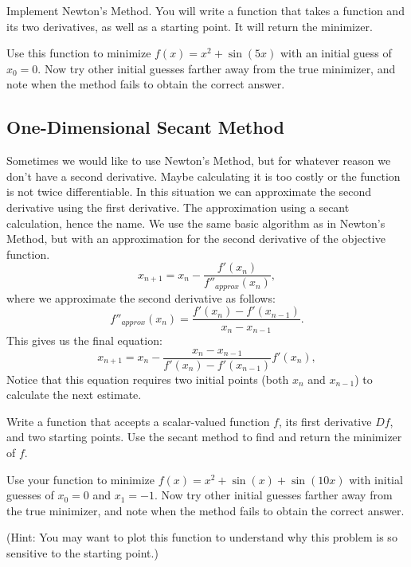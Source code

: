 \begin{problem}
Implement Newton's Method.
You will write a function that takes a function and its two derivatives, as well as a starting point.
It will return the minimizer.

Use this function to minimize $f(x) = x^2 + \sin(5x)$ with an initial guess of $x_0 = 0$.
Now try other initial guesses farther away from the true minimizer, and note when the method fails to obtain the correct answer.
\end{problem}

\subsection*{One-Dimensional Secant Method} %

Sometimes we would like to use Newton's Method, but for whatever reason we don't have a second derivative.
Maybe calculating it is too costly or the function is not twice differentiable.
In this situation we can approximate the second derivative using the first derivative.
The approximation using a secant calculation, hence the name.
We use the same basic algorithm as in Newton's Method, but with an approximation for the second derivative of the objective function.
\begin{equation*}
x_{n+1} = x_n - \frac{f'(x_n)}{f''_{approx}(x_n)},
\end{equation*}
where we approximate the second derivative as follows:
\begin{equation*}
f''_{approx}(x_n) = \frac{f'(x_n) - f'(x_{n-1})}{x_n - x_{n-1}}.
\end{equation*}
This gives us the final equation:
\begin{equation*}
x_{n+1} = x_n - \frac{x_n - x_{n-1}}{f'(x_n) - f'(x_{n-1})}f'(x_n),
\end{equation*}
Notice that this equation requires two initial points (both $x_n$ and $x_{n-1}$) to calculate the next estimate.

\begin{problem} %
Write a function that accepts a scalar-valued function $f$, its first derivative $Df$, and two starting points.
Use the secant method to find and return the minimizer of $f$.

Use your function to minimize $f(x) = x^2 + \sin(x) + \sin(10x)$ with initial guesses of $x_0 = 0$ and $x_1 = -1$.
Now try other initial guesses farther away from the true minimizer, and note when the method fails to obtain the correct answer.

(Hint: You may want to plot this function to understand why this problem is so sensitive to the starting point.)
\end{problem}

